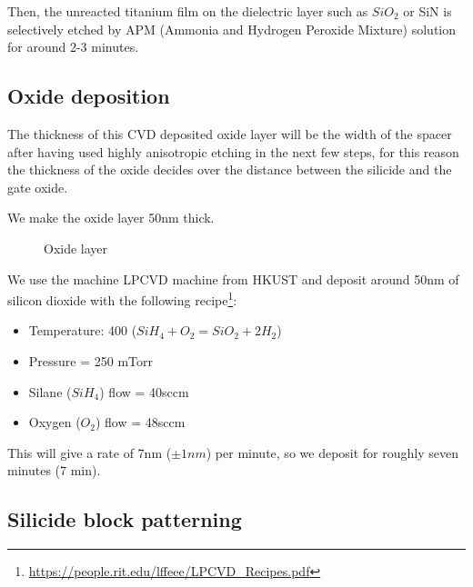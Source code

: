 Then, the unreacted titanium film on the dielectric layer such as $SiO_2$ or SiN is selectively etched by APM (Ammonia and Hydrogen Peroxide Mixture) solution for around 2-3 minutes.

\newpage

\subsection{Oxide deposition}

The thickness of this CVD deposited oxide layer will be the width of the spacer after having used highly anisotropic etching in the next few steps, for this reason the thickness of the oxide decides over the distance between the silicide and the gate oxide.

We make the oxide layer 50nm thick.

\begin{figure}[H]
	\centering
	\begin{tikzpicture}[node distance = 3cm, auto, thick,scale=\CrossSectionOnly, every node/.style={transform shape}]
		
	\end{tikzpicture}
	\begin{tikzpicture}[node distance = 3cm, auto, thick,scale=\CrossSectionOnly, every node/.style={transform shape}]
		
	\end{tikzpicture}
	\caption{Oxide layer}
\end{figure}

We use the machine LPCVD machine from HKUST and deposit around 50nm of silicon dioxide with the following recipe\footnote{\url{https://people.rit.edu/lffeee/LPCVD_Recipes.pdf}}:
\begin{itemize}
	\item Temperature: 400 \degreesC  ($Si H_4 + O_2 = Si O_2 + 2 H_2$)
	\item Pressure = 250 mTorr
	\item Silane ($Si H_4$) flow = 40sccm
	\item Oxygen ($O_2$) flow = 48sccm
\end{itemize}

This will give a rate of 7nm ($\pm 1nm$) per minute, so we deposit for roughly seven minutes (7 min).

\subsection{Silicide block patterning}

